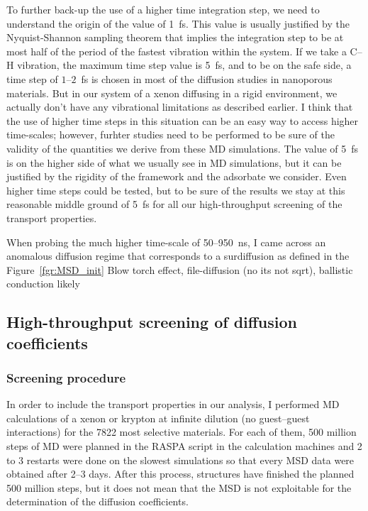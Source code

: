 \documentclass[main]{subfiles}
\begin{document}
To further back-up the use of a higher time integration step, we need to understand the origin of the value of \SI{1}{\fs}. This value is usually justified by the Nyquist-Shannon sampling theorem that implies the integration step to be at most half of the period of the fastest vibration within the system. If we take a C--H vibration, the maximum time step value is \SI{5}{\fs}, and to be on the safe side, a time step of $1$--$2$~\si{\fs} is chosen in most of the diffusion studies in nanoporous materials.\autocite{Bukowski_2021} But in our system of a xenon diffusing in a rigid environment, we actually don't have any vibrational limitations as described earlier. I think that the use of higher time steps in this situation can be an easy way to access higher time-scales; however, furhter studies need to be performed to be sure of the validity of the quantities we derive from these MD simulations. The value of \SI{5}{\fs} is on the higher side of what we usually see in MD simulations, but it can be justified by the rigidity of the framework and the adsorbate we consider. Even higher time steps could be tested, but to be sure of the results we stay at this reasonable middle ground of \SI{5}{\fs} for all our high-throughput screening of the transport properties.

When probing the much higher time-scale of 50--950~\si{\ns}, I came across an anomalous diffusion regime that corresponds to a surdiffusion as defined in the Figure~\ref{fgr:MSD_init}
Blow torch effect, file-diffusion (no its not sqrt), ballistic conduction likely 


\subsection{High-throughput screening of diffusion coefficients}

\subsubsection{Screening procedure}

In order to include the transport properties in our analysis, I performed MD calculations of a xenon or krypton at infinite dilution (no guest--guest interactions) for the 7822 most selective materials. For each of them, 500 million steps of MD were planned in the RASPA script in the calculation machines and 2 to 3 restarts were done on the slowest simulations so that every MSD data were obtained after 2--3 days. After this process,  structures have finished the planned 500 million steps, but it does not mean that the MSD is not exploitable for the determination of the diffusion coefficients. 
\end{document}
